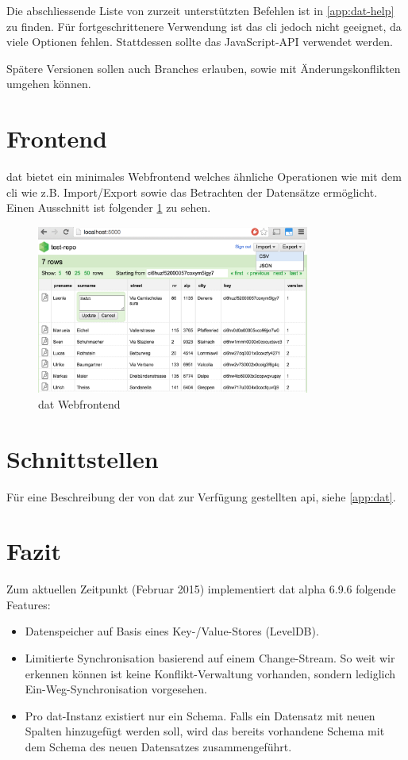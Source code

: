 Die abschliessende Liste von zurzeit unterstützten Befehlen ist in 
\vref{app:dat-help} zu finden. Für fortgeschrittenere Verwendung ist das \gls{cli} jedoch nicht geeignet, da viele Optionen fehlen. Stattdessen sollte das JavaScript-API verwendet werden.

Spätere Versionen sollen auch Branches erlauben, sowie mit Änderungskonflikten umgehen können.

\section{Frontend}

\Gls{dat} bietet ein minimales Webfrontend welches ähnliche Operationen wie mit dem \gls{cli} wie z.B. Import/Export sowie das Betrachten der Datensätze ermöglicht. Einen Ausschnitt ist folgender \cref{fig:dat:webfrontend} zu sehen.

\begin{figure}[H]
  \centering
  \includegraphics[width=0.8\textwidth]{fig/webfrontend}
  \caption{dat Webfrontend}
  \label{fig:dat:webfrontend}
\end{figure}

\section{Schnittstellen}
Für eine Beschreibung der von \gls{dat} zur Verfügung gestellten \gls{api}, siehe \vref{app:dat}.


\section{Fazit}
Zum aktuellen Zeitpunkt (Februar 2015) implementiert dat alpha 6.9.6 folgende Features:
\begin{itemize}
\item Datenspeicher auf Basis eines Key-/Value-Stores (LevelDB).
\item Limitierte Synchronisation basierend auf einem Change-Stream. So weit wir erkennen können ist keine Konflikt-Verwaltung vorhanden, sondern lediglich Ein-Weg-Synchronisation vorgesehen.
\item Pro dat-Instanz existiert nur ein Schema. Falls ein Datensatz mit neuen Spalten hinzugefügt werden soll, wird das bereits vorhandene Schema mit dem Schema des neuen Datensatzes zusammengeführt.
\end{itemize}

